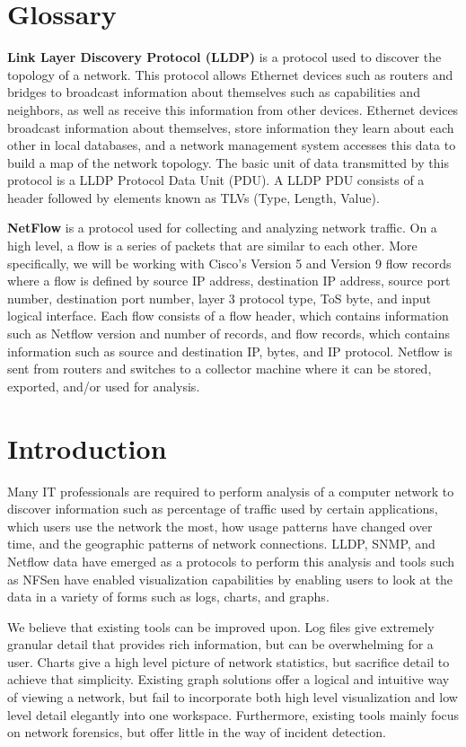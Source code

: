 \documentclass{sig-alternate}
\begin{document}
\section*{Glossary}

\textbf{Link Layer Discovery Protocol (LLDP)} is a protocol used to discover the
topology of a network. This protocol allows Ethernet devices such as routers and
bridges to broadcast information about themselves such as capabilities and
neighbors, as well as receive this information from other devices.  Ethernet
devices broadcast information about themselves, store information they learn
about each other in local databases, and a network management system accesses
this data to build a map of the network topology. The basic unit of data
transmitted by this protocol is a LLDP Protocol Data Unit (PDU). A LLDP PDU
consists of a header followed by elements known as TLVs (Type, Length, Value).

\textbf{NetFlow} is a protocol used for collecting and analyzing network
traffic. On a high level, a flow is a series of packets that are similar to each
other. More specifically, we will be working with Cisco's Version 5 and Version
9 flow records where a flow is defined by source IP address, destination IP
address, source port number, destination port number, layer 3 protocol type, ToS
byte, and input logical interface. Each flow consists of a flow header, which
contains information such as Netflow version and number of records, and flow
records, which contains information such as source and destination IP, bytes,
and IP protocol. Netflow is sent from routers and switches to a collector
machine where it can be stored, exported, and/or used for analysis.

\section{Introduction}

Many IT professionals are required to perform analysis of a computer network to
discover information such as percentage of traffic used by certain applications,
which users use the network the most, how usage patterns have changed over time,
and the geographic patterns of network connections. LLDP, SNMP, and Netflow data
have emerged as a protocols to perform this analysis and tools such as NFSen
have enabled visualization capabilities by enabling users to look at the data in
a variety of forms such as logs, charts, and graphs.

We believe that existing tools can be improved upon. Log files give extremely
granular detail that provides rich information, but can be overwhelming for a
user. Charts give a high level picture of network statistics, but sacrifice
detail to achieve that simplicity. Existing graph solutions offer a logical and
intuitive way of viewing a network, but fail to incorporate both high level
visualization and low level detail elegantly into one workspace. Furthermore,
existing tools mainly focus on network forensics, but offer little in the way of
incident detection.
\end{document}

